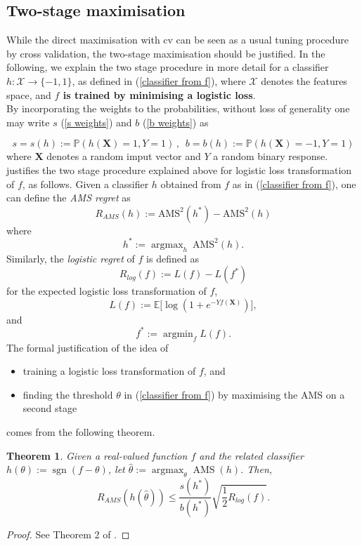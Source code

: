 \documentclass[]{article}
\DeclareMathOperator*{\argmin}{argmin}
\DeclareMathOperator*{\argmax}{argmax}
\newtheorem{theorem}{Theorem}[section]
\begin{document}
\subsection{Two-stage maximisation}

While the direct maximisation with cv can be seen as a usual tuning procedure by cross validation, the two-stage maximisation should be justified. In the following, we explain the two stage procedure in more detail for a classifier $h:\mathcal{X}\to \{-1,1\}$, as defined in (\ref{classifier from f}), where $\mathcal{X}$ denotes the features space, and \textbf{$f$ is trained by minimising a logistic loss}.\\

By incorporating the weights to the probabilities, without loss of generality one may write  $s$ (\ref{s weights}) and $b$ (\ref{b weights}) as

$$s=s(h):=\mathbb{P}(h(\bm{X})=1,Y=1) \,\text{,} \ \ \ b=b(h):=\mathbb{P}(h(\bm{X})=-1,Y=1)$$
where $\bm{X}$ denotes a random imput vector and $Y$ a random binary response. \cite{kotlowski2014consistent} justifies the two stage procedure explained above for logistic loss transformation of $f$, as follows. Given a classifier $h$ obtained from $f$ as in (\ref{classifier from f}), one can define the \textit{AMS regret} as
\begin{equation}
\label{regret}
R_{AMS}(h):= \text{AMS}^2(h^*)-\text{AMS}^2(h)
\end{equation}
where $$h^*:=\argmax_h \ \text{AMS}^2(h).$$
Similarly, the \textit{logistic regret} of $f$ is defined as
\begin{equation}
\label{logistic regret}
R_{log}(f):= L(f)-L(f^*)
\end{equation}
for the expected logistic loss transformation of $f$,
\begin{equation}
\label{eq: logloss}
L(f):=\mathbb{E}\Big[\log(1+e^{-Yf(\bm{X})})\Big],
\end{equation}
and $$f^*:=\argmin_f L(f).$$
The formal justification of the idea of 
\begin{itemize}
\item training a logistic loss transformation of $f$, and
\item finding the threshold $\theta$ in (\ref{classifier from f}) by maximising the AMS on a second stage
\end{itemize}
comes from the following theorem.

\begin{theorem}
\label{thm: two stage maximisation}
Given a real-valued function $f$ and the related classifier $h(\theta):=\operatorname{sgn}(f-\theta)$,  let $\hat{\theta}:=\argmax_\theta\operatorname{AMS}(h)$. Then,
\begin{equation}
\label{regret inequality}
R_{AMS}(h(\hat{\theta}))\leq \frac{s(h^*)}{b(h^*)}\sqrt{\frac{1}{2}R_{log}(f)}.
\end{equation}

\end{theorem}
\begin{proof}
 See Theorem 2 of \cite{kotlowski2014consistent}.
\end{proof}
\end{document}
